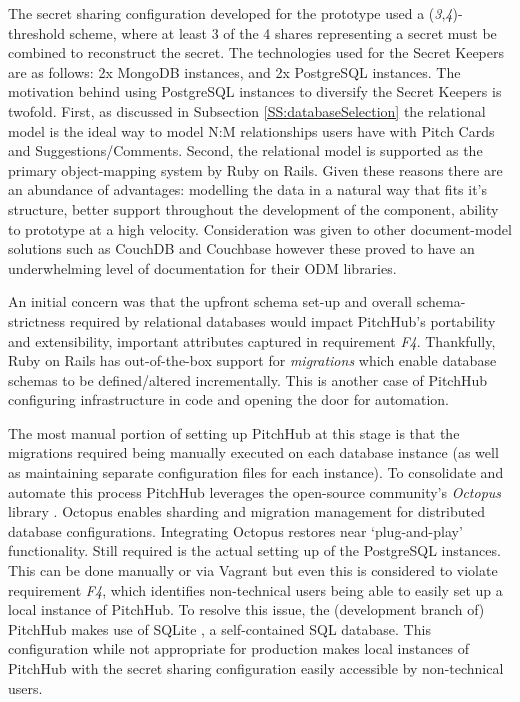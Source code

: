 The secret sharing configuration developed for the prototype used a (\textit{3},\textit{4})-threshold scheme, where at least 3 of the 4 shares representing a secret must be combined to reconstruct the secret. The technologies used for the Secret Keepers are as follows: 2x MongoDB instances, and 2x PostgreSQL instances. The motivation behind using PostgreSQL instances to diversify the Secret Keepers is twofold. First, as discussed in Subsection \ref{SS:databaseSelection} the relational model is the ideal way to model N:M relationships users have with Pitch Cards and Suggestions/Comments. Second, the relational model is supported as the primary object-mapping system by Ruby on Rails. Given these reasons there are an abundance of advantages: modelling the data in a natural way that fits it's structure, better support throughout the development of the component, ability to prototype at a high velocity. Consideration was given to other document-model solutions such as CouchDB \cite{Apach2:online} and Couchbase \cite{Accel4:online} however these proved to have an underwhelming level of documentation for their ODM libraries.
\par
An initial concern was that the upfront schema set-up and overall schema-strictness required by relational databases would impact PitchHub's portability and extensibility, important attributes captured in requirement \textit{F4}. Thankfully, Ruby on Rails has out-of-the-box support for \textit{migrations} which enable database schemas to be defined/altered incrementally. This is another case of PitchHub configuring infrastructure in code and opening the door for automation.
\par
The most manual portion of setting up PitchHub at this stage is that the migrations required being manually executed on each database instance (as well as maintaining separate configuration files for each instance). To consolidate and automate this process PitchHub leverages the open-source community's \textit{Octopus} library \cite{tchan7:online}. Octopus enables sharding and migration management for distributed database configurations. Integrating Octopus restores near `plug-and-play' functionality. Still required is the actual setting up of the PostgreSQL instances. This can be done manually or via Vagrant but even this is considered to violate requirement \textit{F4}, which identifies non-technical users being able to easily set up a local instance of PitchHub. To resolve this issue, the (development branch of) PitchHub makes use of SQLite \cite{SQLit5:online}, a self-contained SQL database. This configuration while not appropriate for production makes local instances of PitchHub with the secret sharing configuration easily accessible by non-technical users.
